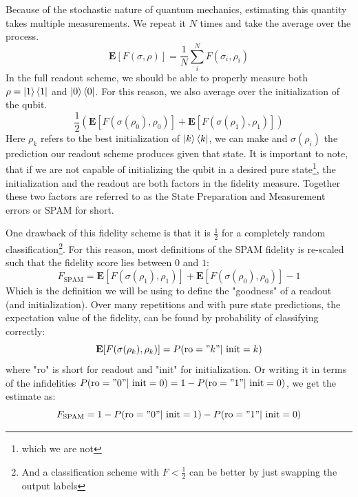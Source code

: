Because of the stochastic nature of quantum mechanics, estimating this quantity takes multiple measurements. We repeat it $N$ times and take the average over the process.  
\begin{equation}
    \mathbf{E}\left[F(\sigma, \rho)\right] = \frac{1}{N}\sum_i^N F(\sigma_i, \rho_i)
\end{equation}
In the full readout scheme, we should be able to properly measure both $\rho = \ket{1}\bra{1}$ and $\ket{0}\bra{0}$. For this reason, we also average over the initialization of the qubit. 
\begin{equation}
     \frac12 \left(\mathbf{E}\left[F(\sigma(\rho_0), \rho_0)\right] +  \mathbf{E}\left[F(\sigma(\rho_1), \rho_1)\right]\right)
\end{equation}
Here $\rho_k$ refers to the best initialization of $\ket{k}\bra{k}$, we can make and $\sigma(\rho_i)$ the prediction our readout scheme produces given that state. It is important to note, that if we are not capable of initializing the qubit in a desired pure state\footnote{which we are not}, the initialization and the readout are both factors in  the fidelity measure. Together these two factors are referred to as the State Preparation and Measurement errors or SPAM for short.

One drawback of this fidelity scheme is that it is $\frac12$ for a completely random classification\footnote{And a classification scheme with $F<\frac12$ can be better by just swapping the output labels}. For this reason, most definitions of the SPAM fidelity \cite{gambetta_protocols_2007, blais_circuit_2021} is re-scaled such that the fidelity score lies between $0$ and $1$:
\begin{equation}
    F_{\text{SPAM}} = \mathbf{E}[F(\sigma(\rho_1), \rho_1)] + \mathbf{E}[F(\sigma(\rho_0), \rho_0)] - 1
\end{equation}
Which is the definition we will be using to define the "goodness" of a readout (and initialization). Over many repetitions and with pure state predictions, the expectation value of the fidelity, can be found by probability of classifying correctly:
\begin{equation}
     \mathbf{E}[F(\sigma(\rho_k), \rho_k)] = P(\text{ro} = "k"| \text{ init} = k)
\end{equation}
where "ro" is short for readout and "init" for initialization. Or writing it in terms of the infidelities $ P(\text{ro} = "0"| \text{ init} = 0) = 1 - P(\text{ro} = "1"| \text{ init} = 0)$, we get the estimate as:
\begin{equation}\label{eq:fidelity_spam_estimate}
    F_{\text{SPAM}} = 1 - P(\text{ro} = "0"| \text{ init} = 1) - P(\text{ro} = "1"| \text{ init} = 0)  
\end{equation}




